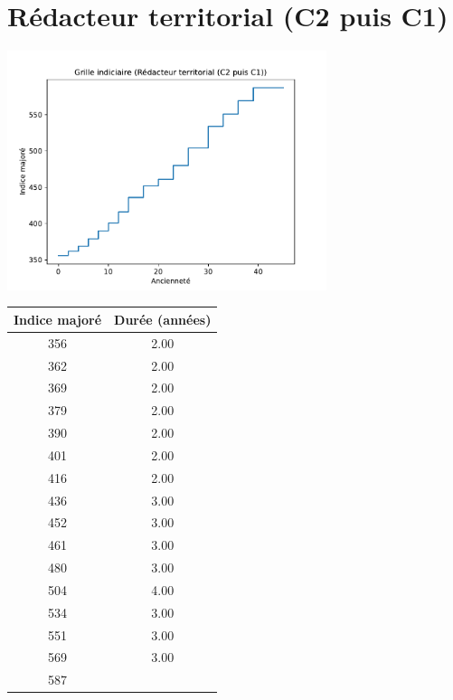 \newpage 
 
\chapter{Rédacteur territorial (C2 puis C1)} 

\begin{minipage}{0.55\linewidth}\includegraphics[width=0.7\textwidth]{fig/grille_Redacteur.pdf}\end{minipage} 
\begin{minipage}{0.3\linewidth} 
 \begin{center} 

\begin{tabular}[htb]{|c|c|} 
\hline 
 Indice majoré &  Durée (années) \\ 
\hline \hline 
 356 &  2.00 \\ 
\hline 
 362 &  2.00 \\ 
\hline 
 369 &  2.00 \\ 
\hline 
 379 &  2.00 \\ 
\hline 
 390 &  2.00 \\ 
\hline 
 401 &  2.00 \\ 
\hline 
 416 &  2.00 \\ 
\hline 
 436 &  3.00 \\ 
\hline 
 452 &  3.00 \\ 
\hline 
 461 &  3.00 \\ 
\hline 
 480 &  3.00 \\ 
\hline 
 504 &  4.00 \\ 
\hline 
 534 &  3.00 \\ 
\hline 
 551 &  3.00 \\ 
\hline 
 569 &  3.00 \\ 
\hline 
 587 &   \\ 
\hline 
\hline 
\end{tabular} 
\end{center} 
 \end{minipage} 


